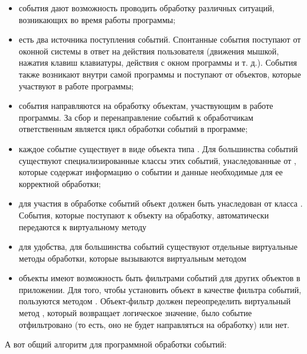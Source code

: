 \begin{itemize}
\item события дают возможность проводить обработку различных ситуаций, возникающих во время работы программы;
\item есть два источника поступления событий. Спонтанные события поступают от оконной системы в ответ на действия
пользователя (движения мышкой, нажатия клавиш клавиатуры, действия с окном программы и т. д.). События также возникают
внутри самой программы и поступают от объектов, которые участвуют в работе программы;
\item события направляются на обработку объектам, участвующим в работе программы. За сбор и перенаправление событий к
обработчикам ответственным является цикл обработки событий в программе;
\item каждое событие существует в виде объекта типа . Для большинства событий существуют
специализированные классы этих событий, унаследованные от , которые содержат информацию о событии
и данные необходимые для ее корректной обработки;
\item для участия в обработке событий объект должен быть унаследован от класса . События, которые
поступают к объекту на обработку, автоматически передаются к виртуальному методу
\item для удобства, для большинства событий существуют отдельные виртуальные методы обработки, которые вызываются
виртуальным методом 
\item объекты имеют возможность быть фильтрами событий для других объектов в приложении. Для того, чтобы установить
объект в качестве фильтра событий, пользуются методом . Объект-фильтр должен
переопределить виртуальный метод , который возвращает логическое значение, было
событие отфильтровано (то есть, оно не будет направляться на обработку) или нет.
\end{itemize}
А вот общий алгоритм для программной обработки событий:

